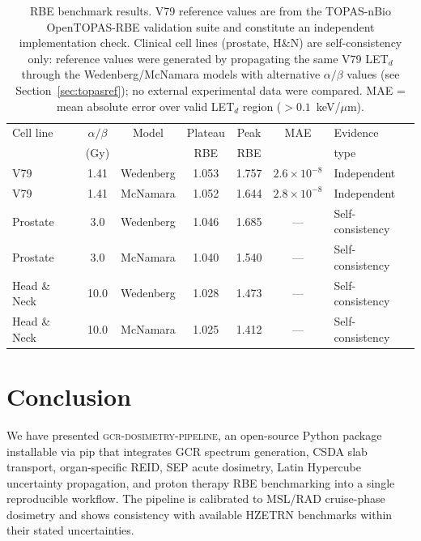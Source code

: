 \documentclass[12pt,letterpaper]{article}
\begin{document}
\begin{table}[H]
  \centering
  \caption{RBE benchmark results. V79 reference values are from the
           TOPAS-nBio OpenTOPAS-RBE validation suite and constitute an
           independent implementation check. Clinical cell lines
           (prostate, H\&N) are self-consistency only: reference values
           were generated by propagating the same V79 LET$_d$ through
           the Wedenberg/McNamara models with alternative $\alpha/\beta$
           values (see Section~\ref{sec:topasref}); no external experimental
           data were compared.
           MAE = mean absolute error over valid LET$_d$ region ($>0.1$~keV/$\mu$m).}
  \label{tab:rbe}
  \small
  \begin{tabular}{lcccccl}
    \toprule
    Cell line & $\alpha/\beta$ & Model & Plateau & Peak & MAE & Evidence \\
              & (Gy)          &       & RBE     & RBE  &     & type     \\
    \midrule
    V79          & 1.41 & Wedenberg & 1.053 & 1.757 & $2.6\times10^{-8}$ & Independent \\
    V79          & 1.41 & McNamara  & 1.052 & 1.644 & $2.8\times10^{-8}$ & Independent \\
    Prostate     & 3.0  & Wedenberg & 1.046 & 1.685 & ---                & Self-consistency \\
    Prostate     & 3.0  & McNamara  & 1.040 & 1.540 & ---                & Self-consistency \\
    Head \& Neck & 10.0 & Wedenberg & 1.028 & 1.473 & ---                & Self-consistency \\
    Head \& Neck & 10.0 & McNamara  & 1.025 & 1.412 & ---                & Self-consistency \\
    \bottomrule
  \end{tabular}
\end{table}



\section{Conclusion}
\label{sec:conclusion}

We have presented \textsc{gcr-dosimetry-pipeline}, an open-source Python package
installable via pip that integrates GCR spectrum generation, CSDA slab transport,
organ-specific REID, SEP acute dosimetry, Latin Hypercube uncertainty
propagation, and proton therapy RBE benchmarking into a single reproducible
workflow.
The pipeline is calibrated to MSL/RAD cruise-phase dosimetry and
shows consistency with available HZETRN benchmarks within their stated
uncertainties.
\end{document}
